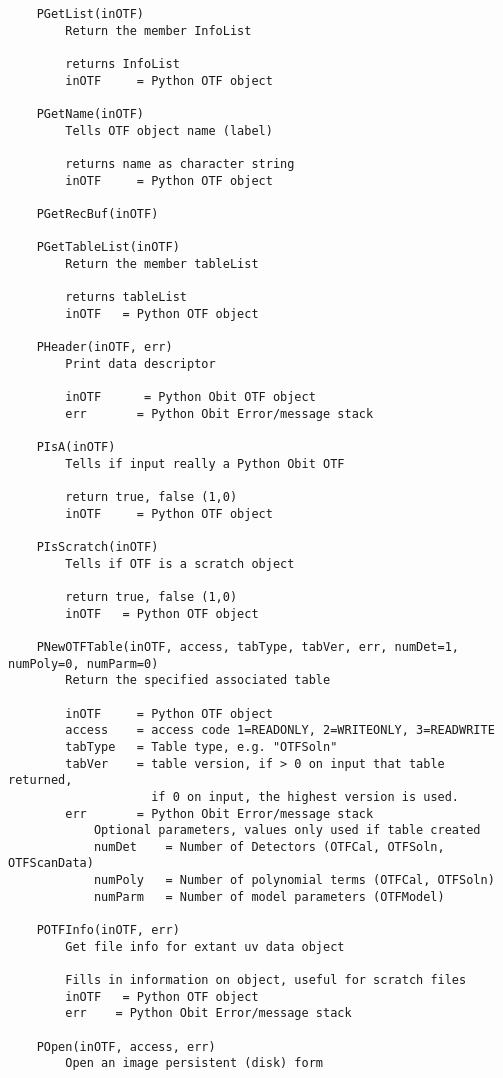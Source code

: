 \documentclass[11pt]{report}
\begin{document}
\begin{verbatim}
    PGetList(inOTF)
        Return the member InfoList
        
        returns InfoList
        inOTF     = Python OTF object
    
    PGetName(inOTF)
        Tells OTF object name (label)
        
        returns name as character string
        inOTF     = Python OTF object
    
    PGetRecBuf(inOTF)
    
    PGetTableList(inOTF)
        Return the member tableList
        
        returns tableList
        inOTF   = Python OTF object
    
    PHeader(inOTF, err)
        Print data descriptor
        
        inOTF      = Python Obit OTF object
        err       = Python Obit Error/message stack
    
    PIsA(inOTF)
        Tells if input really a Python Obit OTF
        
        return true, false (1,0)
        inOTF     = Python OTF object
    
    PIsScratch(inOTF)
        Tells if OTF is a scratch object
        
        return true, false (1,0)
        inOTF   = Python OTF object
    
    PNewOTFTable(inOTF, access, tabType, tabVer, err, numDet=1, numPoly=0, numParm=0)
        Return the specified associated table
        
        inOTF     = Python OTF object
        access    = access code 1=READONLY, 2=WRITEONLY, 3=READWRITE
        tabType   = Table type, e.g. "OTFSoln"
        tabVer    = table version, if > 0 on input that table returned,
                    if 0 on input, the highest version is used.
        err       = Python Obit Error/message stack
            Optional parameters, values only used if table created
            numDet    = Number of Detectors (OTFCal, OTFSoln, OTFScanData)
            numPoly   = Number of polynomial terms (OTFCal, OTFSoln)
            numParm   = Number of model parameters (OTFModel)
    
    POTFInfo(inOTF, err)
        Get file info for extant uv data object
        
        Fills in information on object, useful for scratch files
        inOTF   = Python OTF object
        err    = Python Obit Error/message stack
    
    POpen(inOTF, access, err)
        Open an image persistent (disk) form
        

\end{verbatim}
\end{document}
